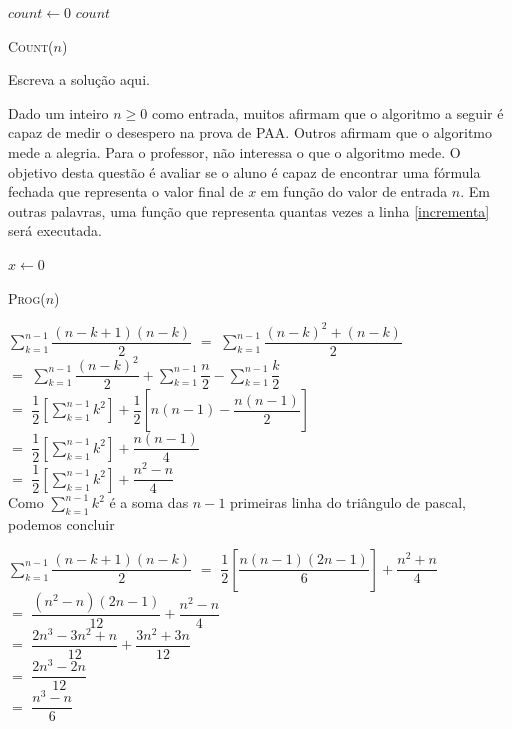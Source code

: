 \documentclass[a4paper]{exam}
\begin{document}
\begin{questions}
\begin{algorithm}[H]
    $count \gets 0$\;
    \Return $count$\;
    \caption{\textsc{Count}($n$)}
  \end{algorithm}
  \begin{solution}
    Escreva a solução aqui.
  \end{solution}
  \question Dado um inteiro $n \geq 0$ como entrada, muitos
  afirmam que o algoritmo a seguir é capaz de medir o desespero na
  prova de PAA. Outros afirmam que o algoritmo mede a alegria. Para
  o professor, não interessa o que o algoritmo mede. O objetivo
  desta questão é avaliar se o aluno é capaz de encontrar uma
  fórmula fechada que representa o valor final de $x$ em função do
  valor de entrada $n$. Em outras palavras, uma função que
  representa quantas vezes a linha \ref{incrementa} será executada.

  \begin{algorithm}[H]
    \NoCaptionOfAlgo
    \DontPrintSemicolon

    $x \gets 0$\;
    \caption{\textsc{Prog}($n$)}
  \end{algorithm}
  \begin{solution}
    $ \displaystyle\sum_{k=1}^{n-1} \dfrac{(n-k+1)(n-k)}{2} $  $=$ $ \displaystyle\sum_{k=1}^{n-1} \dfrac{(n-k)^2 + (n-k)}{2} $\\
    {} $=$ $ \displaystyle\sum_{k=1}^{n-1} \dfrac{(n-k)^2}{2} + \displaystyle\sum_{k=1}^{n-1}  \dfrac{n}{2} - \displaystyle\sum_{k=1}^{n-1} \dfrac{k}{2} $ \\
    {} $=$ $ \dfrac{1}{2}\left[ \displaystyle\sum_{k=1}^{n-1} k ^2 \right] + \dfrac{1}{2} \left[ n(n-1) - \dfrac{n(n-1)}{2} \right]  $\\ 
    {} $=$ $ \dfrac{1}{2} \left[ \displaystyle\sum_{k=1}^{n-1} k^2 \right] + \dfrac{n(n-1)}{4} $\\
    {} $=$ $ \dfrac{1}{2} \left[ \displaystyle\sum_{k=1}^{n-1} k^2 \right] + \dfrac{n^2 -n}{4} $\\

    Como $\displaystyle\sum_{k=1}^{n-1} k^2 $ é a soma das $n-1$  primeiras linha do triângulo de pascal, podemos concluir

    $\displaystyle\sum_{k=1}^{n-1} \dfrac{(n-k+1)(n-k)}{2}$ $=$ $\dfrac{1}{2} \left[ \dfrac{n(n-1)(2n-1)}{6}\right] + \dfrac{n^2 + n}{4} $\\
    {} $=$ $ \dfrac{(n^2 -n)(2n-1)}{12} + \dfrac{n^2 - n}{4}  $\\
    {} $=$ $ \dfrac{2n^3 - 3n^2 + n}{12} + \dfrac{3n^2 + 3n}{12}$\\
    {} $=$ $ \dfrac{2n^3- 2n}{12} $\\
    {} $=$ $ \dfrac{n^3 -n}{6} $\\


\end{solution}
\end{questions}
\end{document}
